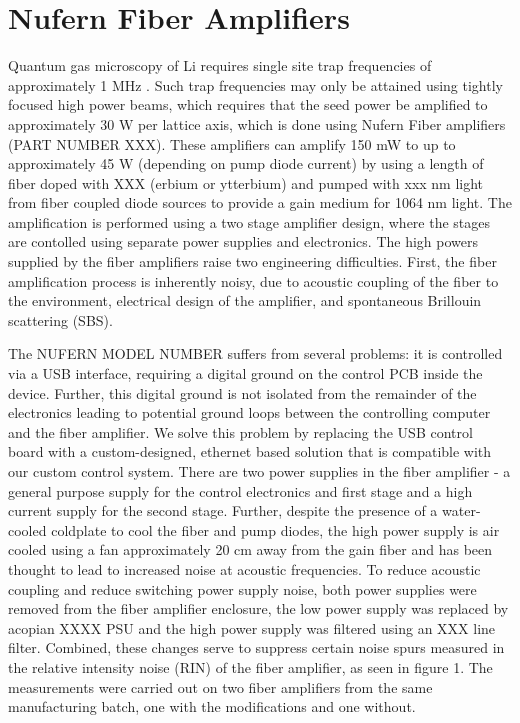 \documentclass[twocolumn,aps,pra,showpacs,preprintnumbers,bibnotes]{revtex4-1}
\begin{document}
\section{Nufern Fiber Amplifiers}
Quantum gas microscopy of Li requires single site trap frequencies of approximately 1 MHz \cite{single site paper}.
Such trap frequencies may only be attained using tightly focused high power beams, which requires that the seed power be amplified to approximately 30 W per lattice axis, which is done using Nufern Fiber amplifiers (PART NUMBER XXX).
These amplifiers can amplify 150 mW to up to approximately 45 W (depending on pump diode current) by using a length of fiber doped with XXX (erbium or ytterbium) and pumped with xxx nm light from fiber coupled diode sources to provide a gain medium for 1064 nm light. 
The amplification is performed using a two stage amplifier design, where the stages are contolled using separate power supplies and electronics.
The high powers supplied by the fiber amplifiers raise two engineering difficulties. First, the fiber amplification process is inherently noisy, due to acoustic coupling of the fiber to the environment, electrical design of the amplifier, and spontaneous Brillouin scattering (SBS). 

The NUFERN MODEL NUMBER suffers from several problems: it is controlled via a USB interface, requiring a digital ground on the control PCB inside the device. Further, this digital ground is not isolated from the remainder of the electronics leading to potential ground loops between the controlling computer and the fiber amplifier. 
We solve this problem by replacing the USB control board with a custom-designed, ethernet based solution that is compatible with our custom control system. 
There are two power supplies in the fiber amplifier - a general purpose supply for the control electronics and first stage and a high current supply for the second stage. 
Further, despite the presence of a water-cooled coldplate to cool the fiber and pump diodes, the high power supply is air cooled using a fan approximately 20 cm away from the gain fiber and has been thought to lead to increased noise at acoustic frequencies.
To reduce acoustic coupling and reduce switching power supply noise, both power supplies were removed from the fiber amplifier enclosure, the low power supply was replaced by acopian XXXX PSU and the high power supply was filtered using an XXX line filter.
Combined, these changes serve to suppress certain noise spurs measured in the relative intensity noise (RIN) of the fiber amplifier, as seen in figure 1. 
The measurements were carried out on two fiber amplifiers from the same manufacturing batch, one with the modifications and one without.
\end{document}
